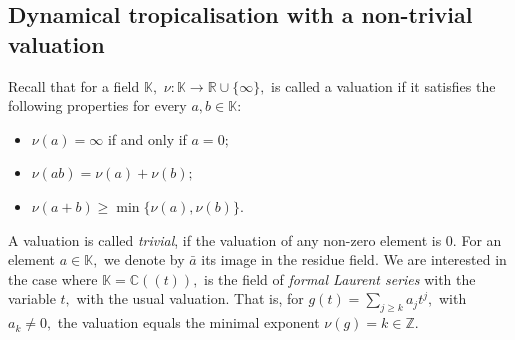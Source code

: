 \documentclass[11pt]{amsart}
\theoremstyle{definition}
\newcommand{\R}{\mathbb{R}}
\newcommand{\lto}{\longrightarrow}
\newcommand{\C}{\mathbb{C}}
\begin{document}
\subsection{Dynamical tropicalisation with a non-trivial valuation}
Recall that for a field $\mathbb{K},$  $\nu:\mathbb{K}\lto \R \cup \{\infty \},$ is called a valuation if it satisfies the following properties for every $a, b \in \mathbb{K}$: 
\begin{itemize}
    \item [(a)] $\nu(a) = \infty$ if and only if $a=0;$
    \item [(b)] $\nu(ab) = \nu(a) + \nu(b);$
    \item [(c)] $\nu(a+b) \geq \min \{\nu(a) , \nu(b) \}.$
\end{itemize}
A valuation is called \emph{trivial}, if the valuation of any non-zero element is 0. For an element $a \in \mathbb{K},$ we denote by $\bar{a}$ its image in the residue field. We are interested in the case where $\mathbb{K}= \C((t)),$ is the field of \emph{formal Laurent series} with the variable $t,$ with the usual valuation. That is, for $g(t) = \sum_{j\geq k} a_j t^j,$ with $a_k \neq 0,$ the valuation equals the minimal exponent $\nu(g) = k \in \mathbb{Z}.$  
\end{document}
